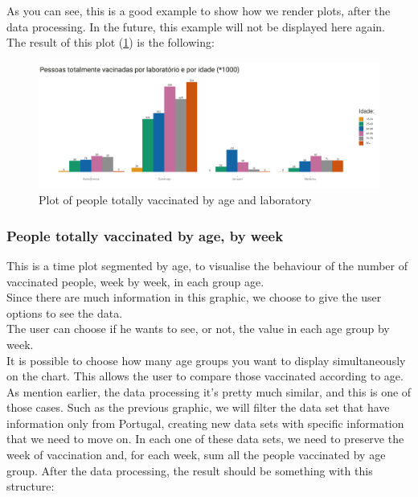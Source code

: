 As you can see, this is a good example to show how we render plots, after the data processing. In the future, this example will not be displayed here again. \\
The result of this plot  (\ref{fig:ages-vac}) is the following:\\

\begin{figure}[H]
\centering
\includegraphics[width=400pt,trim=10 0 0 -10mm]{images/coiso3.png}
\caption{Plot of people totally vaccinated by age and laboratory}
\label{fig:ages-vac}
\end{figure}


\subsubsection{People totally vaccinated by age, by week}
This is a time plot segmented by age,  to visualise the behaviour of the number of vaccinated people,  week by week, in each group age.\\
Since there are much information in this graphic, we choose to give the user options to see the data.\\
The user can choose if he wants to see, or not, the value in each age group by week. %
\\
It is possible to choose how many age groups you want to display simultaneously on the chart. This allows the user to compare those vaccinated according to age.
\\
As mention earlier, the data processing it's pretty much similar, and this is one of those cases. Such as the previous graphic, we will filter the data set that have information only from Portugal, creating new data sets with specific information that we need to move on. In each one of these data sets, we need to preserve the week of vaccination and, for each week, sum all the people vaccinated by age group.
After the data processing, the result should be something with this structure:\\

